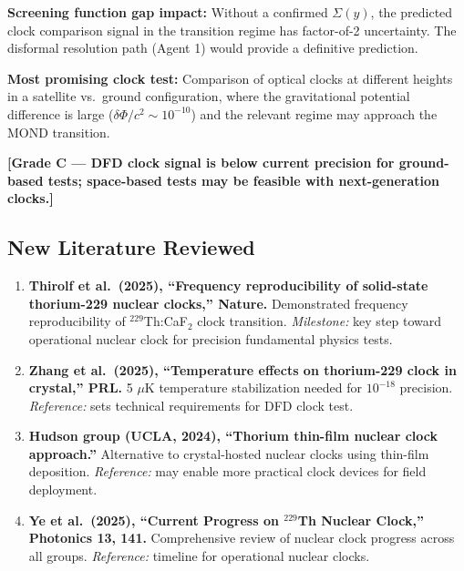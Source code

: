 \documentclass[11pt]{article}
\begin{document}
\textbf{Screening function gap impact:} Without a confirmed $\Sigma(y)$,
the predicted clock comparison signal in the transition regime has
factor-of-2 uncertainty. The disformal resolution path (Agent 1) would
provide a definitive prediction.

\textbf{Most promising clock test:} Comparison of optical clocks at
different heights in a satellite vs.\ ground configuration, where the
gravitational potential difference is large ($\delta\Phi/c^2 \sim 10^{-10}$)
and the relevant regime may approach the MOND transition.

\textbf{[Grade C --- DFD clock signal is below current precision for
ground-based tests; space-based tests may be feasible with next-generation
clocks.]}

\subsection{New Literature Reviewed}

\begin{tcolorbox}[colback=green!5!white, colframe=green!50!black,
  title=\textbf{Agent 3: NEW LITERATURE REVIEWED}]

\begin{enumerate}

\item \textbf{Thirolf et al.\ (2025), ``Frequency reproducibility of
  solid-state thorium-229 nuclear clocks,'' Nature.}
  Demonstrated frequency reproducibility of $^{229}$Th:CaF$_2$ clock
  transition. \emph{Milestone:} key step toward operational nuclear
  clock for precision fundamental physics tests.

\item \textbf{Zhang et al.\ (2025), ``Temperature effects on thorium-229
  clock in crystal,'' PRL.}
  5 $\mu$K temperature stabilization needed for $10^{-18}$ precision.
  \emph{Reference:} sets technical requirements for DFD clock test.

\item \textbf{Hudson group (UCLA, 2024), ``Thorium thin-film nuclear
  clock approach.''}
  Alternative to crystal-hosted nuclear clocks using thin-film
  deposition. \emph{Reference:} may enable more practical clock
  devices for field deployment.

\item \textbf{Ye et al.\ (2025), ``Current Progress on $^{229}$Th
  Nuclear Clock,'' Photonics 13, 141.}
  Comprehensive review of nuclear clock progress across all groups.
  \emph{Reference:} timeline for operational nuclear clocks.

\end{enumerate}
\end{tcolorbox}
\end{document}
